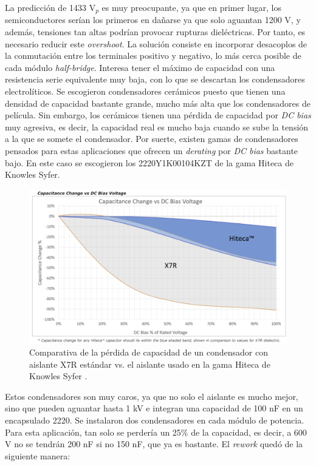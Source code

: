 La predicción de 1433 $\text{V}_p$ es muy preocupante, ya que en primer lugar, los semiconductores serían los primeros en dañarse ya que solo aguantan 1200 V, y además, tensiones tan altas podrían provocar rupturas dieléctricas. Por tanto, es necesario reducir este \textit{overshoot}. La solución consiste en incorporar desacoplos de la conmutación entre los terminales positivo y negativo, lo más cerca posible de cada módulo \textit{half-bridge}. Interesa tener el máximo de capacidad con una resistencia serie equivalente muy baja, con lo que se descartan los condensadores electrolíticos. Se escogieron condensadores cerámicos puesto que tienen una densidad de capacidad bastante grande, mucho más alta que los condensadores de película. Sin embargo, los cerámicos tienen una pérdida de capacidad por \textit{DC bias} muy agresiva, es decir, la capacidad real es mucho baja  cuando se sube la tensión a la que se somete el condensador. Por suerte, existen gamas de condensadores pensados para estas aplicaciones que ofrecen un \textit{derating} por \textit{DC bias} bastante bajo. En este caso se escogieron los 2220Y1K00104KZT de la gama Hiteca de Knowles Syfer.

\begin{figure}[H]
	\centering
	\includegraphics[width=0.7\linewidth]{fig/hiteca}
	\caption{Comparativa de la pérdida de capacidad de un condensador con aislante X7R estándar vs. el aislante usado en la gama Hiteca de Knowles Syfer \cite{KnowlesCapacitors}.}
\end{figure}

Estos condensadores son muy caros, ya que no solo el aislante es mucho mejor, sino que pueden aguantar hasta 1 kV e integran una capacidad de 100 nF en un encapsulado 2220. Se instalaron dos condensadores en cada módulo de potencia. Para esta aplicación, tan solo se perdería un 25\% de la capacidad, es decir, a 600 V no se tendrán 200 nF si no 150 nF, que ya es bastante. El \textit{rework} quedó de la siguiente manera:


